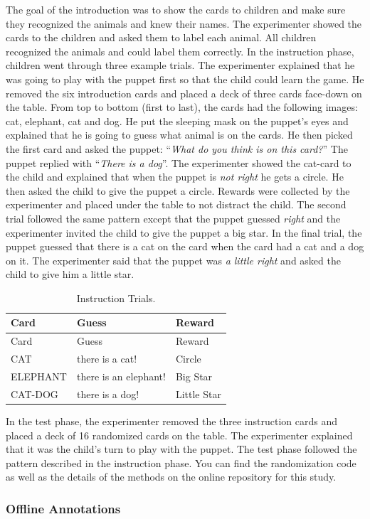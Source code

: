 \documentclass[oneside]{report}
\theoremstyle{definition}
\theoremstyle{definition}
\theoremstyle{definition}
\theoremstyle{remark}
\begin{document}
The goal of the introduction was to show the cards to children and make
sure they recognized the animals and knew their names. The experimenter
showed the cards to the children and asked them to label each animal.
All children recognized the animals and could label them correctly. In
the instruction phase, children went through three example trials. The
experimenter explained that he was going to play with the puppet first
so that the child could learn the game. He removed the six introduction
cards and placed a deck of three cards face-down on the table. From top
to bottom (first to last), the cards had the following images: cat,
elephant, cat and dog. He put the sleeping mask on the puppet's eyes and
explained that he is going to guess what animal is on the cards. He then
picked the first card and asked the puppet: ``\emph{What do you think is
on this card?}'' The puppet replied with ``\emph{There is a dog}''. The
experimenter showed the cat-card to the child and explained that when
the puppet is \emph{not right} he gets a circle. He then asked the child
to give the puppet a circle. Rewards were collected by the experimenter
and placed under the table to not distract the child. The second trial
followed the same pattern except that the puppet guessed \emph{right}
and the experimenter invited the child to give the puppet a big star. In
the final trial, the puppet guessed that there is a cat on the card when
the card had a cat and a dog on it. The experimenter said that the
puppet was \emph{a little right} and asked the child to give him a
little star.
\begin{longtable}[]{@{}lll@{}}
\caption{\label{tab:instruction} Instruction Trials.}\tabularnewline
\toprule
Card & Guess & Reward\tabularnewline
\midrule
\endfirsthead
\toprule
Card & Guess & Reward\tabularnewline
\midrule
\endhead
CAT & there is a cat! & Circle\tabularnewline
ELEPHANT & there is an elephant! & Big Star\tabularnewline
CAT-DOG & there is a dog! & Little Star\tabularnewline
\bottomrule
\end{longtable}
In the test phase, the experimenter removed the three instruction cards
and placed a deck of 16 randomized cards on the table. The experimenter
explained that it was the child's turn to play with the puppet. The test
phase followed the pattern described in the instruction phase. You can
find the randomization code as well as the details of the methods on the
online repository for this study.

\subsubsection{Offline Annotations}\label{feedbackCoding}
\end{document}
